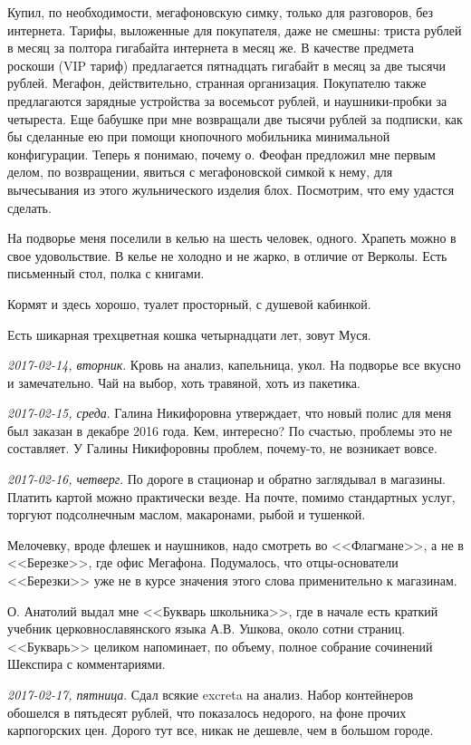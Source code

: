 \documentclass[
    12pt
    ,a4paper
    ,oneside
    ,russian
]{memoir}
\newcommand{\mydatestamp}{
    \bigskip   %
    \emph
}
\newcommand{\mds}{\mydatestamp}
\begin{document}
    Купил, по необходимости, мегафоновскую симку, только для разговоров, без интернета. Тарифы, выложенные для покупателя, даже не смешны: триста рублей в месяц за полтора гигабайта интернета в месяц же. В качестве предмета роскоши (VIP тариф) предлагается пятнадцать гигабайт в месяц за две тысячи рублей. Мегафон, действительно, странная организация. Покупателю также предлагаются зарядные устройства за восемьсот рублей, и наушники-пробки за четыреста. Еще бабушке при мне возвращали две тысячи рублей за подписки, как бы сделанные ею при помощи кнопочного мобильника минимальной конфигурации. Теперь я понимаю, почему о. Феофан предложил мне первым делом, по возвращении, явиться с мегафоновской симкой к нему, для вычесывания из этого жульнического изделия блох. Посмотрим, что ему удастся сделать.
    
    На подворье меня поселили в келью на шесть человек, одного. Храпеть можно в свое удовольствие. В келье не холодно и не жарко, в отличие от Верколы. Есть письменный стол, полка с книгами.
    
    Кормят и здесь хорошо, туалет просторный, с душевой кабинкой.
    
    Есть шикарная трехцветная кошка четырнадцати лет, зовут Муся.
    
    \mds{2017-02-14, вторник}. Кровь на анализ, капельница, укол. На подворье все вкусно и замечательно. Чай на выбор, хоть травяной, хоть из пакетика.
    
    \mds{2017-02-15, среда}. Галина Никифоровна утверждает, что новый полис для меня был заказан в декабре 2016 года. Кем, интересно? По счастью, проблемы это не составляет. У Галины Никифоровны проблем, почему-то, не возникает вовсе.

    \mds{2017-02-16, четверг}. По дороге в стационар и обратно заглядывал в магазины. Платить картой можно практически везде. На почте, помимо стандартных услуг, торгуют подсолнечным маслом, макаронами, рыбой и тушенкой.
    
    Мелочевку, вроде флешек и наушников, надо смотреть во <<Флагмане>>, а не в <<Березке>>, где офис Мегафона. Подумалось, что отцы-основатели <<Березки>> уже не в курсе значения этого слова применительно к магазинам.
    
    О. Анатолий выдал мне <<Букварь школьника>>, где в начале есть краткий учебник церковнославянского языка А.В. Ушкова, около сотни страниц. <<Букварь>> целиком напоминает, по объему, полное собрание сочинений Шекспира с комментариями.

    \mds{2017-02-17, пятница}. Сдал всякие excreta на анализ. Набор контейнеров обошелся в пятьдесят рублей, что показалось недорого, на фоне прочих карпогорских цен. Дорого тут все, никак не дешевле, чем в большом городе.
    
\end{document}
